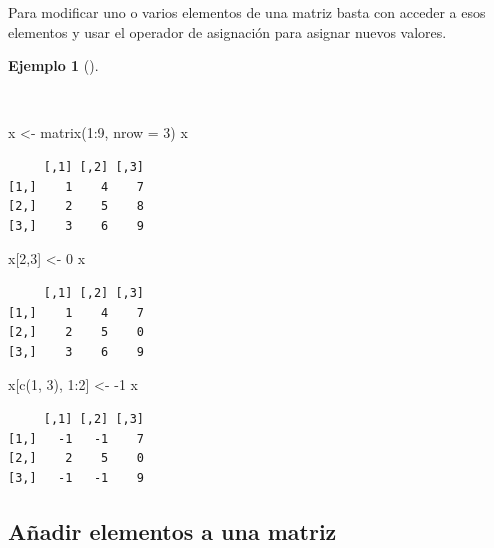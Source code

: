 \documentclass[
  spanish,
  a4paper,
]{scrreport}
\newenvironment{Shaded}{\begin{snugshade}}{\end{snugshade}}
\newcommand{\AttributeTok}[1]{\textcolor[rgb]{0.40,0.45,0.13}{#1}}
\newcommand{\DecValTok}[1]{\textcolor[rgb]{0.68,0.00,0.00}{#1}}
\newcommand{\FunctionTok}[1]{\textcolor[rgb]{0.28,0.35,0.67}{#1}}
\newcommand{\NormalTok}[1]{\textcolor[rgb]{0.00,0.23,0.31}{#1}}
\newcommand{\OtherTok}[1]{\textcolor[rgb]{0.00,0.23,0.31}{#1}}
\newcommand{\SpecialCharTok}[1]{\textcolor[rgb]{0.37,0.37,0.37}{#1}}
\theoremstyle{definition}
\theoremstyle{definition}
\newtheorem{example}{Ejemplo}[chapter]
\theoremstyle{remark}
\begin{document}
Para modificar uno o varios elementos de una matriz basta con acceder a
esos elementos y usar el operador de asignación para asignar nuevos
valores.

\begin{example}[]\protect\hypertarget{exm-modificacion-matriz}{}\label{exm-modificacion-matriz}

~

\begin{Shaded}
\begin{Highlighting}[]
\NormalTok{x }\OtherTok{\textless{}{-}} \FunctionTok{matrix}\NormalTok{(}\DecValTok{1}\SpecialCharTok{:}\DecValTok{9}\NormalTok{, }\AttributeTok{nrow =} \DecValTok{3}\NormalTok{)}
\NormalTok{x}
\end{Highlighting}
\end{Shaded}

\begin{verbatim}
     [,1] [,2] [,3]
[1,]    1    4    7
[2,]    2    5    8
[3,]    3    6    9
\end{verbatim}

\begin{Shaded}
\begin{Highlighting}[]
\NormalTok{x[}\DecValTok{2}\NormalTok{,}\DecValTok{3}\NormalTok{] }\OtherTok{\textless{}{-}} \DecValTok{0}
\NormalTok{x}
\end{Highlighting}
\end{Shaded}

\begin{verbatim}
     [,1] [,2] [,3]
[1,]    1    4    7
[2,]    2    5    0
[3,]    3    6    9
\end{verbatim}

\begin{Shaded}
\begin{Highlighting}[]
\NormalTok{x[}\FunctionTok{c}\NormalTok{(}\DecValTok{1}\NormalTok{, }\DecValTok{3}\NormalTok{), }\DecValTok{1}\SpecialCharTok{:}\DecValTok{2}\NormalTok{] }\OtherTok{\textless{}{-}} \SpecialCharTok{{-}}\DecValTok{1}
\NormalTok{x}
\end{Highlighting}
\end{Shaded}

\begin{verbatim}
     [,1] [,2] [,3]
[1,]   -1   -1    7
[2,]    2    5    0
[3,]   -1   -1    9
\end{verbatim}

\end{example}

\subsection{Añadir elementos a una
matriz}\label{auxf1adir-elementos-a-una-matriz}
\end{document}
